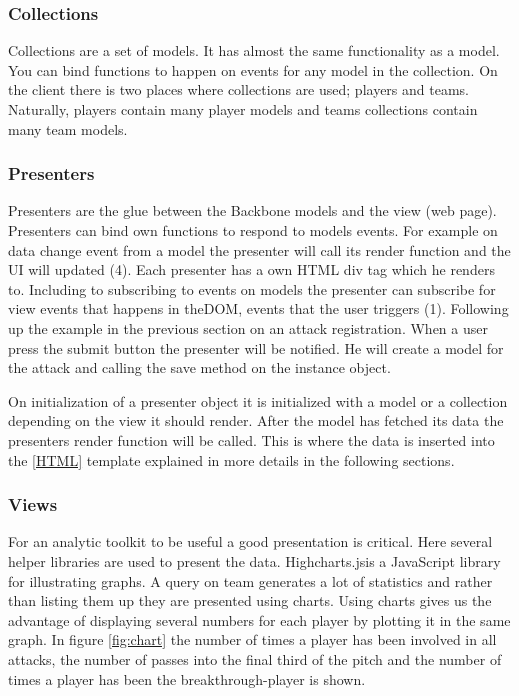 \subsubsection{Collections}
Collections are a set of models. It has almost the same functionality as a model. You can bind functions to happen on events for any model in the collection. On the client there is two places where collections are used; players and teams. Naturally, players contain many player models and teams collections contain many team models.

\subsubsection{Presenters}

Presenters are the glue between the Backbone models and the view (web page).  Presenters can bind own functions to respond to models events. For example on data change event from a model the presenter will call its render function and the \ac{UI} will updated (4). Each presenter has a own \ac{HTML} div tag which he renders to. Including to subscribing to events on models the presenter can subscribe for view events that happens in the\ac{DOM}, events that the user triggers (1). Following up the example in the previous section on an attack registration. When a user press the submit button the presenter will be notified. He will create a model for the attack and calling the save method on the instance object. 

On initialization of a presenter object it is initialized with a model or a collection depending on the view it should render.  After the model has fetched its data the presenters render function will be called. This is where the data is inserted into the \ref{HTML} template explained in more details in the following sections.

\subsubsection{Views}

For an analytic toolkit to be useful a good presentation is critical. Here several helper libraries are used to present the data. Highcharts.js\footnotemark is a JavaScript library for illustrating graphs. A query on team generates a lot of statistics and rather than listing them up they are presented using charts. Using charts gives us the advantage of displaying several numbers for each player by plotting it in the same graph. In figure \ref{fig:chart} the number of times a player has been involved in all attacks, the number of passes into the final third of the pitch and the number of times a player has been the breakthrough-player is shown.

